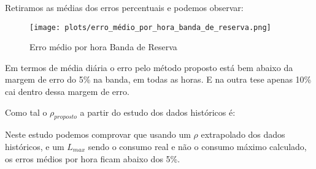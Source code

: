 Retiramos as médias dos erros percentuais e podemos observar: \\

\begin{figure}[H]
    \centering
    \texttt{[image: plots/erro\_médio\_por\_hora\_banda\_de\_reserva.png]}
    \caption{Erro médio por hora Banda de Reserva}
\end{figure}

Em termos de média diária o erro pelo método proposto está bem abaixo da margem de erro do 5\% na banda, em todas as horas. E na outra tese apenas 10\% cai dentro dessa margem de erro.\par

Como tal o $\rho_{proposto}$ a partir do estudo dos dados  históricos é: \

\begin{table}[H] \centering \caption{Valores de $\rho$ propostos}  \end{table}








Neste estudo podemos comprovar que usando um $\rho$ extrapolado dos dados históricos, e um $L_{max}$ sendo o consumo real e não o consumo máximo calculado, os erros médios por hora ficam abaixo dos 5\%.\par